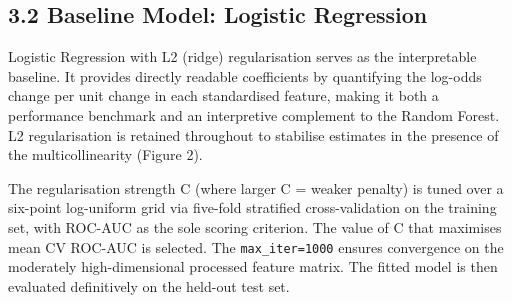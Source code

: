 \documentclass[11pt]{article}
\begin{document}
    \hypertarget{baseline-model-logistic-regression}{%
\subsection{3.2 Baseline Model: Logistic
Regression}\label{baseline-model-logistic-regression}}

Logistic Regression with L2 (ridge) regularisation serves as the
interpretable baseline. It provides directly readable coefficients by
quantifying the log-odds change per unit change in each standardised
feature, making it both a performance benchmark and an interpretive
complement to the Random Forest. L2 regularisation is retained
throughout to stabilise estimates in the presence of the
multicollinearity (Figure 2).

The regularisation strength C (where larger C = weaker penalty) is tuned
over a six-point log-uniform grid via five-fold stratified
cross-validation on the training set, with ROC-AUC as the sole scoring
criterion. The value of C that maximises mean CV ROC-AUC is selected.
The \texttt{max\_iter=1000} ensures convergence on the moderately
high-dimensional processed feature matrix. The fitted model is then
evaluated definitively on the held-out test set.
\end{document}
